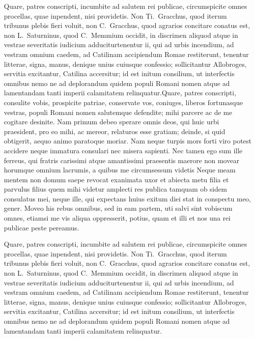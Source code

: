 \documentclass[a4paper,12pt,twoside,swedish]{report}
\begin{document}
Quare, patres conscripti, incumbite ad salutem rei publicae,
circumspicite omnes procellas, quae inpendent, nisi providetis. Non
Ti.~Gracchus, quod iterum tribunus plebis fieri voluit, non
C.~Gracchus, quod agrarios concitare conatus est, non L.~Saturninus,
quod C.~Memmium occidit, in discrimen aliquod atque in vestrae
severitatis iudicium adduciturtenentur ii, qui ad urbis incendium, ad
vestram omnium caedem, ad Catilinam accipiendum Romae restiterunt,
tenentur litterae, signa, manus, denique unius cuiusque confessio;
sollicitantur Allobroges, servitia excitantur, Catilina accersitur; id
est initum consilium, ut interfectis omnibus nemo ne ad deplorandum
quidem populi Romani nomen atque ad lamentandam tanti imperii
calamitatem relinquatur.Quare, patres conscripti, consulite vobis, prospicite patriae,
conservate vos, coniuges, liberos fortunasque vestras, populi Romani
nomen salutemque defendite; mihi parcere ac de me cogitare desinite. Nam
primum debeo sperare omnis deos, qui huic urbi praesident, pro eo mihi,
ac mereor, relaturos esse gratiam; deinde, si quid obtigerit, aequo
animo paratoque moriar. Nam neque turpis mors forti viro potest accidere
neque immatura consulari nec misera sapienti. Nec tamen ego sum ille
ferreus, qui fratris carissimi atque amantissimi praesentis maerore non
movear horumque omnium lacrumis, a quibus me circumsessum videtis Neque
meam mentem non domum saepe revocat exanimata uxor et abiecta metu filia
et parvulus filius quem mihi videtur amplecti res publica tamquam ob
sidem consulatus mei, neque ille, qui expectans huius exitum diei stat
in conspectu meo, gener. Moveo his rebus omnibus, sed in eam partem, uti
salvi sint vobiscum omnes, etiamsi me vis aliqua oppresserit, potius,
quam et illi et nos una rei publicae peste pereamus.



Quare, patres conscripti, incumbite ad salutem rei publicae,
circumspicite omnes procellas, quae inpendent, nisi providetis. Non
Ti.~Gracchus, quod iterum tribunus plebis fieri voluit, non
C.~Gracchus, quod agrarios concitare conatus est, non L.~Saturninus,
quod C.~Memmium occidit, in discrimen aliquod atque in vestrae
severitatis iudicium adduciturtenentur ii, qui ad urbis incendium, ad
vestram omnium caedem, ad Catilinam accipiendum Romae restiterunt,
tenentur litterae, signa, manus, denique unius cuiusque confessio;
sollicitantur Allobroges, servitia excitantur, Catilina accersitur; id
est initum consilium, ut interfectis omnibus nemo ne ad deplorandum
quidem populi Romani nomen atque ad lamentandam tanti imperii
calamitatem relinquatur.
\end{document}
